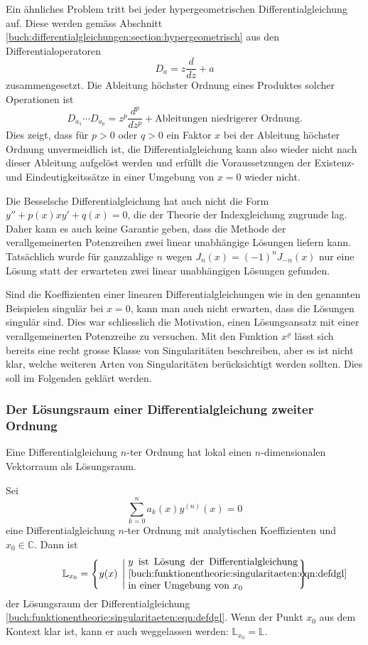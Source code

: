 Ein ähnliches Problem tritt bei jeder hypergeometrischen
Differentialgleichung auf.
Diese werden gemäss Abschnitt
\ref{buch:differentialgleichungen:section:hypergeometrisch}
aus den Differentialoperatoren
\[
D_a=z\frac{d}{dz} + a
\]
zusammengesetzt.
Die Ableitung höchster Ordnung eines Produktes solcher Operationen ist
\[
D_{a_1}
\cdots
D_{a_p}
=
z^p\frac{d^p}{dz^p} + \text{Ableitungen niedrigerer Ordnung}.
\]
Dies zeigt, dass für $p>0$ oder $q>0$ ein Faktor $x$ bei der
Ableitung höchster Ordnung unvermeidlich ist, die Differentialgleichung
kann also wieder nicht nach dieser Ableitung aufgelöst werden und
erfüllt die Voraussetzungen der Existenz- und Eindeutigkeitssätze
in einer Umgebung von $x=0$ wieder nicht.

Die Besselsche Differentialgleichung
hat auch nicht die Form $y''+p(x)xy'+q(x)=0$, die der Theorie der 
Indexgleichung zugrunde lag.
Daher kann es auch keine Garantie geben, dass die Methode der
verallgemeinerten Potenzreihen zwei linear unabhängige Lösungen
liefern kann.
Tatsächlich wurde für ganzzahlige $n$ wegen $J_n(x) = (-1)^n J_{-n}(x)$
nur eine Lösung statt der erwarteten zwei linear unabhängigen
Lösungen gefunden.

Sind die Koeffizienten einer linearen Differentialgleichungen wie
in den genannten Beispielen singulär bei $x=0$, kann man auch nicht
erwarten, dass die Lösungen singulär sind.
Dies war schliesslich die Motivation, einen Lösungsansatz mit einer
verallgemeinerten Potenzreihe zu versuchen.
Mit den Funktion $x^\varrho$ lässt sich bereits eine recht grosse
Klasse von Singularitäten beschreiben, aber es ist nicht klar,
welche weiteren Arten von Singularitäten berücksichtigt werden sollten.
Dies soll im Folgenden geklärt werden.

%
%
\subsubsection{Der Lösungsraum einer Differentialgleichung zweiter Ordnung}
Eine Differentialgleichung $n$-ter Ordnung hat lokal einen $n$-dimensionalen
Vektorraum als Lösungsraum.

\begin{definition}
Sei 
\begin{equation}
\sum_{k=0}^n a_k(x) y^{(n)}(x) = 0
\label{buch:funktionentheorie:singularitaeten:eqn:defdgl}
\end{equation}
eine Differentialgleichung $n$-ter Ordnung mit analytischen Koeffizienten
und $x_0\in \mathbb{C}$.
Dann ist
\[
\mathbb{L}_{x_0}
=
\left\{
y(x)
\;\left|\;
\begin{minipage}{6cm}
$y$ ist Lösung der Differentialgleichung
\eqref{buch:funktionentheorie:singularitaeten:eqn:defdgl}
in einer Umgebung von $x_0$
\end{minipage}
\right.
\right\}
\]
der Lösungsraum der Differentialgleichung
\eqref{buch:funktionentheorie:singularitaeten:eqn:defdgl}.
Wenn der Punkt $x_0$ aus dem Kontext klar ist, kann er auch weggelassen
werden: $\mathbb{L}_{x_0}=\mathbb{L}$.
\end{definition}


